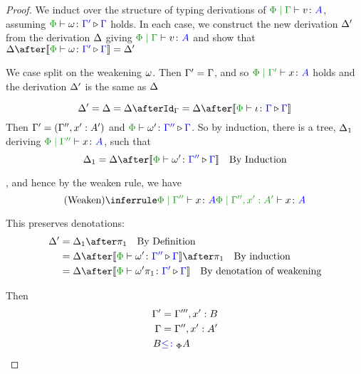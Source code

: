 \documentclass{report}
\begin{document}
\begin{framed}
    \begin{proof}
        
        We induct over the structure of typing derivations of $\gpetyperelation{v}{A}$, assuming $\ewrel{\P}{\w}{\G'}{\G}$ holds. In each case, we construct the new derivation $\Delta'$ from the derivation $\Delta$ giving $\gpetyperelation{v}{A}$ and show that $\D\after\deno{\ewrel{\P}{\w}{\G'}{\G}} = \D'$
        
                We case split on the weakening $\omega$.
                \subcase{$\w = \i$}
                Then $\Gamma' = \Gamma$, and so $\etyperelation{\P}{\G'}{x}{A}$ holds and the derivation $\Delta'$ is the same as $\Delta$
        
                \begin{equation}
                    \D' = \D = \D\after\idg = \D\after\deno{\ewrel{\P}{\i}{\G}{\G}} 
                \end{equation}
                Then  $\Gamma' = (\Gamma'',x': A')$ and $\ewrel{\P}{\w'}{\G''}{\G}$. So by induction, there is a tree, $\Delta_1$ deriving $\etyperelation{\P}{\G''}{x}{A}$,  such that 
                \begin{equation}
                    \D_1 = \D\after\deno{\ewrel{\P}{\w'}{\G''}{\G}} \qt{By Induction}
                \end{equation}
                
                , and hence by the weaken rule, we have 
                \begin{equation}
                    \ntreeruleI{\vweaken}{\etyperelation{\P}{\G''}{x}{A}}{\etyperelation{\P}{\G'', x':A' }{x}{A}}
                \end{equation}
        
                This preserves denotations:
                \begin{align*}
                    \D' & = \D_1\after\p\qt{By Definition} \\
                    & = \D\after\deno{\ewrel{\P}{\w'}{\G''}{\G}}\after\p\qt{By induction}\\
                    & = \D\after\deno{\ewrel{\P}{\w'\p}{\G'}{\G}}\qt{By denotation of weakening}
                \end{align*}
        
                Then 
                \begin{align*}
                    \Gamma' & = \Gamma''', x': B\\
                    \Gamma &= \Gamma'', x': A'\\
                    B & {\color{blue} \leq\colon}_\Phi A
                \end{align*}
        

\end{proof}
\end{framed}
\end{document}
